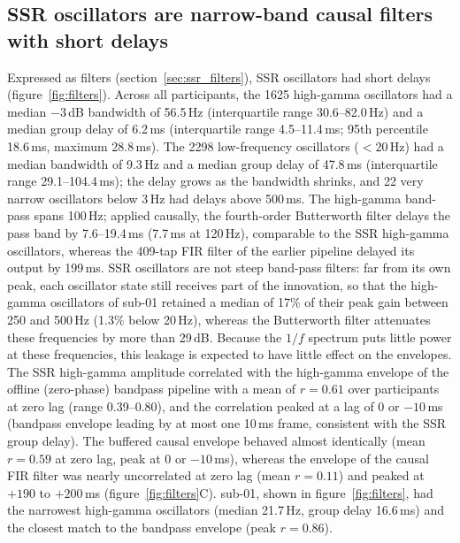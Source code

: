 \documentclass{iopjournal}
\begin{document}
\subsection{SSR oscillators are narrow-band causal filters with short delays}
\label{sec:res_filters}

Expressed as filters (section~\ref{sec:ssr_filters}), SSR oscillators had short delays (figure~\ref{fig:filters}). Across all participants, the 1625 high-gamma oscillators had a median $-3$\,dB bandwidth of 56.5\,Hz (interquartile range 30.6--82.0\,Hz) and a median group delay of 6.2\,ms (interquartile range 4.5--11.4\,ms; 95th percentile 18.6\,ms, maximum 28.8\,ms). The 2298 low-frequency oscillators ($<20$\,Hz) had a median bandwidth of 9.3\,Hz and a median group delay of 47.8\,ms (interquartile range 29.1--104.4\,ms); the delay grows as the bandwidth shrinks, and 22 very narrow oscillators below 3\,Hz had delays above 500\,ms. The high-gamma band-pass spans 100\,Hz; applied causally, the fourth-order Butterworth filter delays the pass band by 7.6--19.4\,ms (7.7\,ms at 120\,Hz), comparable to the SSR high-gamma oscillators, whereas the 409-tap FIR filter of the earlier pipeline delayed its output by 199\,ms. SSR oscillators are not steep band-pass filters: far from its own peak, each oscillator state still receives part of the innovation, so that the high-gamma oscillators of sub-01 retained a median of 17\% of their peak gain between 250 and 500\,Hz (1.3\% below 20\,Hz), whereas the Butterworth filter attenuates these frequencies by more than 29\,dB. Because the $1/f$ spectrum puts little power at these frequencies, this leakage is expected to have little effect on the envelopes. The SSR high-gamma amplitude correlated with the high-gamma envelope of the offline (zero-phase) bandpass pipeline with a mean of $r=0.61$ over participants at zero lag (range 0.39--0.80), and the correlation peaked at a lag of 0 or $-10$\,ms (bandpass envelope leading by at most one 10\,ms frame, consistent with the SSR group delay). The buffered causal envelope behaved almost identically (mean $r=0.59$ at zero lag, peak at 0 or $-10$\,ms), whereas the envelope of the causal FIR filter was nearly uncorrelated at zero lag (mean $r=0.11$) and peaked at $+190$ to $+200$\,ms (figure~\ref{fig:filters}C). sub-01, shown in figure~\ref{fig:filters}, had the narrowest high-gamma oscillators (median 21.7\,Hz, group delay 16.6\,ms) and the closest match to the bandpass envelope (peak $r=0.86$).
\end{document}
